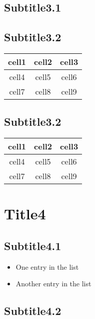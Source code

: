 \documentclass{uimppracticas}
\begin{document}
\subsection{Subtitle3.1}

\subsection{Subtitle3.2}

  \begin{center}
    \begin{tabular}{ | c | c | c | }
      \hline
     cell1 & cell2 & cell3 \\
     \hline
     cell4 & cell5 & cell6 \\
     \hline
     cell7 & cell8 & cell9 \\
     \hline
    \end{tabular}
  \end{center}

\subsection{Subtitle3.2}

  \begin{center}
    \begin{tabular}{  c | c | c  }

     cell1 & cell2 & cell3 \\
     \hline
     \hline
     cell4 & cell5 & cell6 \\
     cell7 & cell8 & cell9 \\
    \end{tabular}
  \end{center}


\section{Title4}
\subsection{Subtitle4.1}

  \begin{itemize}
    \item One entry in the list
    \item Another entry in the list
  \end{itemize}

\subsection{Subtitle4.2}
\end{document}
